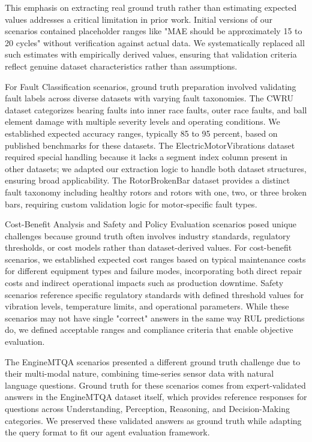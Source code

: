 \documentclass[conference]{IEEEtran}
\begin{document}
This emphasis on extracting real ground truth rather than estimating expected values addresses a critical limitation in prior work. Initial versions of our scenarios contained placeholder ranges like "MAE should be approximately 15 to 20 cycles" without verification against actual data. We systematically replaced all such estimates with empirically derived values, ensuring that validation criteria reflect genuine dataset characteristics rather than assumptions.

For Fault Classification scenarios, ground truth preparation involved validating fault labels across diverse datasets with varying fault taxonomies. The CWRU dataset categorizes bearing faults into inner race faults, outer race faults, and ball element damage with multiple severity levels and operating conditions. We established expected accuracy ranges, typically 85 to 95 percent, based on published benchmarks for these datasets. The ElectricMotorVibrations dataset required special handling because it lacks a segment index column present in other datasets; we adapted our extraction logic to handle both dataset structures, ensuring broad applicability. The RotorBrokenBar dataset provides a distinct fault taxonomy including healthy rotors and rotors with one, two, or three broken bars, requiring custom validation logic for motor-specific fault types.

Cost-Benefit Analysis and Safety and Policy Evaluation scenarios posed unique challenges because ground truth often involves industry standards, regulatory thresholds, or cost models rather than dataset-derived values. For cost-benefit scenarios, we established expected cost ranges based on typical maintenance costs for different equipment types and failure modes, incorporating both direct repair costs and indirect operational impacts such as production downtime. Safety scenarios reference specific regulatory standards with defined threshold values for vibration levels, temperature limits, and operational parameters. While these scenarios may not have single "correct" answers in the same way RUL predictions do, we defined acceptable ranges and compliance criteria that enable objective evaluation.

The EngineMTQA scenarios presented a different ground truth challenge due to their multi-modal nature, combining time-series sensor data with natural language questions. Ground truth for these scenarios comes from expert-validated answers in the EngineMTQA dataset itself, which provides reference responses for questions across Understanding, Perception, Reasoning, and Decision-Making categories. We preserved these validated answers as ground truth while adapting the query format to fit our agent evaluation framework.
\end{document}
